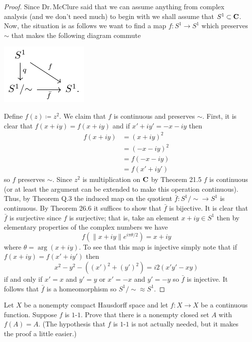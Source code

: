 \begin{proof}
Since Dr.\,McClure said that we can assume anything from complex analysis
(and we don't need much) to begin with we shall assume that
$S^1\subset\mathbf{C}$. Now, the situation is as follows we want to find a map
$f\colon S^1\to S^1$ which preserves $\sim$ that makes the following
diagram commute
\begin{center}
\includegraphics{figures/mid-2-rp-1-s-1}
\end{center}
Define $f(z)\coloneqq z^2$. We claim that $f$ is continuous and preserves
$\sim$. First, it is clear that $f(x+iy)=f(x+iy)$ and
if $x'+iy'=-x-iy$ then
\begin{align*}
f(x+iy)&=(x+iy)^2\\
       &=(-x-iy)^2\\
       &=f(-x-iy)\\
       &=f(x'+iy')
\end{align*}
so $f$ preserves $\sim$. Since $z^2$ is multiplication on $\mathbf{C}$ by Theorem
21.5 $f$ is continuous (or at least the argument can be extended to make
this operation continuous). Thus, by Theorem Q.3 the induced map on the
quotient $\bar f\colon S^1/{\sim}\to S^1$ is continuous. By Theorem 26.6 it
suffices to show that $\bar f$ is bijective. It is clear that $\bar f$ is
surjective since $f$ is surjective; that is, take an element $x+iy\in S^1$
then by elementary properties of the complex numbers we have
\[
f\left(\|x+iy\|e^{i\pi\theta/2}\right)=x+iy
\]
where $\theta=\arg(x+iy)$. To see that this map is injective
simply note that if $f(x+iy)=f(x'+iy')$ then
\[
x^2-y^2-((x')^2+(y')^2)=i2(x'y'-xy)
\]
if and only if $x'=x$ and $y'=y$ or $x'=-x$ and $y'=-y$ so $\bar f$ is
injective. It follows that $\bar f$ is a homeomorphism so
$S^1/{\sim}\approx S^1$.
\end{proof}
\begin{problem}
Let $X$ be a nonempty compact Hausdorff space and let $f\colon
X\to X$ be a continuous function. Suppose $f$ is $1$-$1$. Prove
that there is a nonempty closed set $A$ with $f(A)=A$. (The
hypothesis that $f$ is $1$-$1$ is not actually needed, but it
makes the proof a little easier.)
\end{problem}
